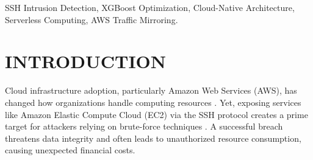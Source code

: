 \documentclass[conference]{IEEEtran}
\begin{document}
\begin{abstract}
Cloud infrastructures like Amazon Web Services (AWS) are frequent targets for Secure Shell (SSH) brute-force attacks because of their central role in server management. Although many machine learning models can detect these attacks, they often carry high computational overhead. This makes real-world deployment difficult, especially in serverless environments where speed and cost matter. This study introduces a streamlined SSH brute-force detection method using an optimized eXtreme Gradient Boosting (XGBoost) model. We first evaluated three algorithms (XGBoost, Random Forest, and Support Vector Machine (SVM)) via 5-fold cross-validation; XGBoost proved the most accurate and efficient. We then applied a feature selection technique to isolate the 10 most influential traffic attributes, significantly reducing the data processing burden. The core of our proposed architecture relies on AWS Traffic Mirroring and CICFlowMeter to extract these 10 features directly from raw packets. We integrated this extraction layer with Amazon Simple Storage Service (S3) for storage and AWS Lambda for inference. Experimental results on the CSE-CIC-IDS2018 SSH-Bruteforce dataset show that the 10-feature XGBoost model achieves an F1-score of 99.85%
\end{abstract}

\begin{IEEEkeywords}
SSH Intrusion Detection, XGBoost Optimization, Cloud-Native Architecture, Serverless Computing, AWS Traffic Mirroring.
\end{IEEEkeywords}



\section{INTRODUCTION}

Cloud infrastructure adoption, particularly Amazon Web Services (AWS), has changed how organizations handle computing resources \cite{b12}. Yet, exposing services like Amazon Elastic Compute Cloud (EC2) via the SSH protocol creates a prime target for attackers relying on brute-force techniques \cite{b10, b11, b13}. A successful breach threatens data integrity and often leads to unauthorized resource consumption, causing unexpected financial costs.
\end{document}
